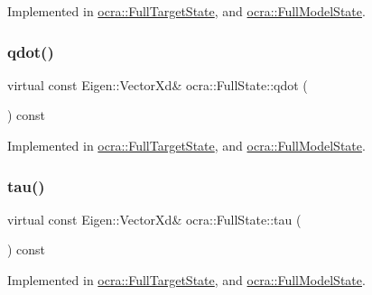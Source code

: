 Implemented in \hyperlink{classocra_1_1FullTargetState_a1436b42b01d2857e4dc5c53a233f0e69}{ocra\+::\+Full\+Target\+State}, and \hyperlink{classocra_1_1FullModelState_a2578e15742268c14fb4ce5f26033256e}{ocra\+::\+Full\+Model\+State}.

\hypertarget{classocra_1_1FullState_a7018fe03dc3c8b3ec95d3c2015ae60e6}{}\label{classocra_1_1FullState_a7018fe03dc3c8b3ec95d3c2015ae60e6} 
\subsubsection{\texorpdfstring{qdot()}{qdot()}}
{\footnotesize\ttfamily virtual const Eigen\+::\+Vector\+Xd\& ocra\+::\+Full\+State\+::qdot (\begin{DoxyParamCaption}{ }\end{DoxyParamCaption}) const\hspace{0.3cm}{\ttfamily [pure virtual]}}



Implemented in \hyperlink{classocra_1_1FullTargetState_a2ada581270803a39e8c690f8c9354644}{ocra\+::\+Full\+Target\+State}, and \hyperlink{classocra_1_1FullModelState_a034c567bae39a29f391f6462f52b0834}{ocra\+::\+Full\+Model\+State}.

\hypertarget{classocra_1_1FullState_a24723b4a382c2bf51e6c32cbd1bd7b06}{}\label{classocra_1_1FullState_a24723b4a382c2bf51e6c32cbd1bd7b06} 
\subsubsection{\texorpdfstring{tau()}{tau()}}
{\footnotesize\ttfamily virtual const Eigen\+::\+Vector\+Xd\& ocra\+::\+Full\+State\+::tau (\begin{DoxyParamCaption}{ }\end{DoxyParamCaption}) const\hspace{0.3cm}{\ttfamily [pure virtual]}}



Implemented in \hyperlink{classocra_1_1FullTargetState_a56855f5d42e84f456a89fd259c4b7edb}{ocra\+::\+Full\+Target\+State}, and \hyperlink{classocra_1_1FullModelState_aa774cf6a9a50ed4b50c037ae981d2c7b}{ocra\+::\+Full\+Model\+State}.

\hypertarget{classocra_1_1FullState_a75ec7c039df8cb8608ebf34f7b779be5}{}\label{classocra_1_1FullState_a75ec7c039df8cb8608ebf34f7b779be5} 
